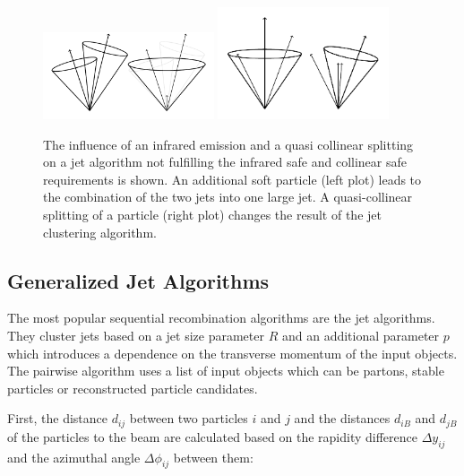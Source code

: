 \begin{figure}[htbp]
    \centering
    \includegraphics[width=0.45\textwidth]{figures/drawings/infrared_safety/jetinfrared.pdf}\hfill
    \includegraphics[width=0.45\textwidth]{figures/drawings/infrared_safety/jetcollinear.pdf}
    \caption[Effect of infrared emissions and collinear splitting on jet
    algorithms]{The influence of an infrared emission and a quasi
        collinear splitting on a jet algorithm not fulfilling the infrared safe
        and collinear safe requirements is shown. An additional soft particle (left plot)
    leads to the combination of the two jets into one large jet. A
quasi-collinear splitting of a particle (right plot) changes the result of the
jet clustering algorithm.}
    \label{fig:infrared_safety}
\end{figure}

\subsection{Generalized \kt Jet Algorithms}

The most popular sequential recombination algorithms are the \kt jet
algorithms. They cluster jets based on a jet size parameter $R$ and an
additional parameter $p$ which introduces a dependence on the transverse momentum of
the input objects. The pairwise algorithm uses a list of input objects which
can be partons, stable particles or reconstructed particle candidates.

First, the distance $d_{ij}$ between two particles $i$ and $j$ and the distances
$d_{iB}$ and $d_{jB}$ of the particles to the beam are calculated based on the
rapidity difference $\Delta y_{ij}$ and the azimuthal angle $\Delta \phi_{ij}$
between them:

